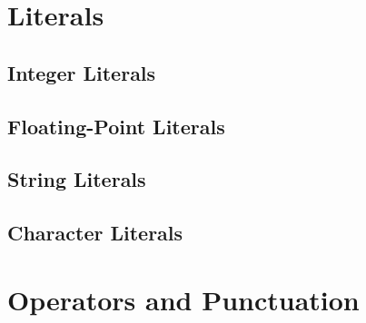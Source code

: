 \section{Literals}

\subsection{Integer Literals}

\subsection{Floating-Point Literals}

\subsection{String Literals}

\subsection{Character Literals}

\section{Operators and Punctuation}



